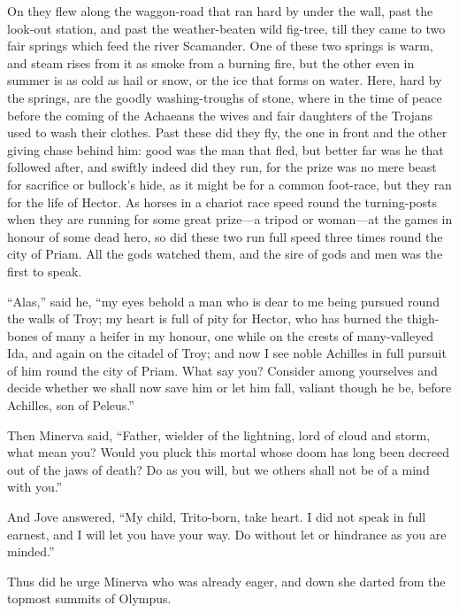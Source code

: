 On they flew along the waggon-road that ran hard by under the wall, past
the look-out station, and past the weather-beaten wild fig-tree, till they
came to two fair springs which feed the river Scamander. One of these two
springs is warm, and steam rises from it as smoke from a burning fire, but
the other even in summer is as cold as hail or snow, or the ice that forms
on water. Here, hard by the springs, are the goodly washing-troughs of
stone, where in the time of peace before the coming of the Achaeans the
wives and fair daughters of the Trojans used to wash their clothes. Past
these did they fly, the one in front and the other giving chase behind
him: good was the man that fled, but better far was he that followed
after, and swiftly indeed did they run, for the prize was no mere beast
for sacrifice or bullock’s hide, as it might be for a common foot-race,
but they ran for the life of Hector. As horses in a chariot race speed
round the turning-posts when they are running for some great prize—a
tripod or woman—at the games in honour of some dead hero, so did
these two run full speed three times round the city of Priam. All the gods
watched them, and the sire of gods and men was the first to speak.

“Alas,” said he, “my eyes behold a man who is dear to me being pursued
round the walls of Troy; my heart is full of pity for Hector, who has
burned the thigh-bones of many a heifer in my honour, one while on the
crests of many-valleyed Ida, and again on the citadel of Troy; and now I
see noble Achilles in full pursuit of him round the city of Priam. What
say you? Consider among yourselves and decide whether we shall now save
him or let him fall, valiant though he be, before Achilles, son of
Peleus.”

Then Minerva said, “Father, wielder of the lightning, lord of cloud and
storm, what mean you? Would you pluck this mortal whose doom has long been
decreed out of the jaws of death? Do as you will, but we others shall not
be of a mind with you.”

And Jove answered, “My child, Trito-born, take heart. I did not speak in
full earnest, and I will let you have your way. Do without let or
hindrance as you are minded.”

Thus did he urge Minerva who was already eager, and down she darted from
the topmost summits of Olympus.

